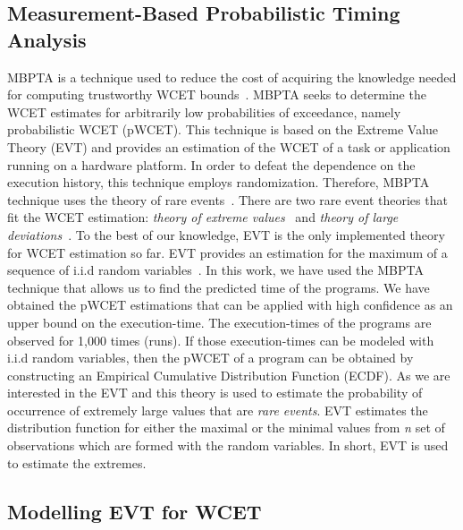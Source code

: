 \subsection{Measurement-Based Probabilistic Timing Analysis}
\label{mbpta}
MBPTA is a technique used to reduce the cost of acquiring the knowledge needed for computing trustworthy WCET bounds~\cite{cucu2012measurement,kosmidis2014pub}. MBPTA seeks to determine the WCET estimates for arbitrarily low probabilities of exceedance, namely probabilistic WCET (pWCET). This technique is based on the Extreme Value Theory (EVT) and provides an estimation of the WCET of a task or application running on a hardware platform. In order to defeat the dependence on the execution history, this technique employs randomization. Therefore, MBPTA technique uses the theory of rare events~\cite{Cazorla:2013:PPA:2465787.2465796}. There are two rare event theories that fit the WCET estimation: \textit{theory of extreme values}~\cite{gumbel1954statistical} and \textit{theory of large deviations}~\cite{gumbel1954statistical}. To the best of our knowledge, EVT is the only implemented theory for WCET estimation so far. EVT provides an estimation for the maximum of a sequence of i.i.d random variables~\cite{hoeffding1963probability}. In this work, we have used the MBPTA technique that allows us to find the predicted time of the programs. We have obtained the pWCET estimations that can be applied with high confidence as an upper bound on the execution-time. The execution-times of the programs are observed for 1,000 times (runs). If those execution-times can be modeled with i.i.d random variables, then the pWCET of a program can be obtained by constructing an Empirical Cumulative Distribution Function (ECDF). As we are interested in the EVT and this theory is used to estimate the probability of occurrence of extremely large values that are  \textit{rare events}. EVT estimates the distribution function for either the maximal or  the minimal values from \textit{n} set of observations which are formed with the random variables. In short, EVT is used to estimate the extremes. 
\subsection{Modelling EVT for WCET}

